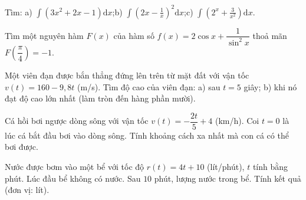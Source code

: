 \begin{bai}Tìm: a) $\displaystyle\int\left(3x^2+2x-1\right)\mathrm dx$;\quad b) $\displaystyle\int\left(2x-\frac1x\right)^2\mathrm dx$;\quad c) $\displaystyle\int\left(2^x+\frac3{x^2}\right)\mathrm dx$.
\end{bai}
\begin{bai}Tìm một nguyên hàm $F(x)$ của hàm số $f(x)=2\cos x+\dfrac1{\sin^2x}$ thoả mãn $F\left(\dfrac\pi4\right)=-1$.
\end{bai}
\begin{bai}Một viên đạn được bắn thẳng đứng lên trên từ mặt đất với vận tốc $v(t)=160-9{,}8t$ (m/s). Tìm độ cao của viên đạn: a) sau $t=5$ giây; b) khi nó đạt độ cao lớn nhất (làm tròn đến hàng phần mười).
\end{bai}
\begin{bai}Cá hồi bơi ngược dòng sông với vận tốc $v(t)=-\dfrac{2t}5+4$ (km/h). Coi $t=0$ là lúc cá bắt đầu bơi vào dòng sông. Tính khoảng cách xa nhất mà con cá có thể bơi được.
\end{bai}
\begin{bai}Nước được bơm vào một bể với tốc độ $r(t)=4t+10$ (lít/phút), $t$ tính bằng phút. Lúc đầu bể không có nước. Sau $10$ phút, lượng nước trong bể. Tính kết quả (đơn vị: lít).

\end{bai}
